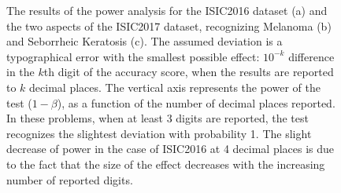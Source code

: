 \documentclass[3p, times]{elsarticle}
\begin{document}
\begin{figure}
    \begin{center}
    \end{center}
    \caption{{\color{blue}The results of the power analysis for the ISIC2016 dataset (a) and the two aspects of the ISIC2017 dataset, recognizing Melanoma (b) and Seborrheic Keratosis (c). The assumed deviation is a typographical error with the smallest possible effect: $10^{-k}$ difference in the $k$th digit of the accuracy score, when the results are reported to $k$ decimal places. The vertical axis represents the power of the test ($1 - \beta$), as a function of the number of decimal places reported. In these problems, when at least 3 digits are reported, the test recognizes the slightest deviation with probability 1. The slight decrease of power in the case of ISIC2016 at 4 decimal places is due to the fact that the size of the effect decreases with the increasing number of reported digits.}}
    \label{fig:powerskin}
\end{figure}
\end{document}
